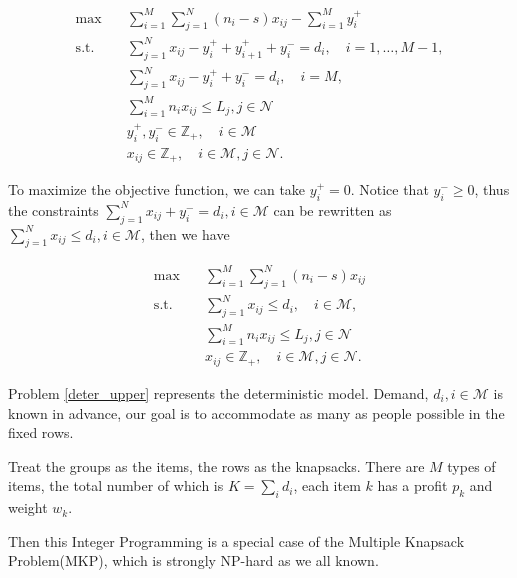 \begin{equation}\label{one_form}
  \begin{aligned}
  \max \quad & \sum_{i=1}^{M}  \sum_{j= 1}^{N} (n_i-s) x_{ij} - \sum_{i=1}^{M} y_{i}^{+}  \\
  \text {s.t.} \quad & \sum_{j= 1}^{N} x_{ij} - y_{i}^{+}+ y_{i+1}^{+} + y_{i}^{-} = d_{i}, \quad i = 1, \ldots, M-1, \\
  & \sum_{j= 1}^{N} x_{ij} -y_{i}^{+} + y_{i}^{-} = d_{i}, \quad i = M, \\
  & \sum_{i=1}^{M} n_{i} x_{ij} \leq L_j, j \in \mathcal{N}\\
  & y_{i}^{+}, y_{i}^{-} \in \mathbb{Z}_{+}, \quad i \in \mathcal{M} \\
  & x_{ij} \in \mathbb{Z}_{+}, \quad i \in \mathcal{M}, j \in \mathcal{N}.
  \end{aligned}
\end{equation}

To maximize the objective function, we can take $y_i^{+} = 0$. Notice that $y_{i}^{-} \geq 0$, thus the constraints $\sum_{j= 1}^{N} x_{ij} + y_{i}^{-} = d_{i}, i \in \mathcal{M}$ can be rewritten as $\sum_{j= 1}^{N} x_{ij} \leq d_{i}, i \in \mathcal{M}$, then we have

\begin{equation}\label{deter_upper}
  \begin{aligned}
  \max \quad & \sum_{i=1}^{M}  \sum_{j= 1}^{N} (n_i- s) x_{ij} \\
  \text {s.t.} \quad & \sum_{j= 1}^{N} x_{ij} \leq d_{i}, \quad i \in \mathcal{M}, \\
  & \sum_{i=1}^{M} n_{i} x_{ij} \leq L_j, j \in \mathcal{N} \\
  & x_{ij} \in \mathbb{Z}_{+}, \quad i \in \mathcal{M}, j \in \mathcal{N}.
  \end{aligned}
\end{equation}

Problem \eqref{deter_upper} represents the deterministic model. Demand, $d_i, i \in \mathcal{M}$ is known in advance, our goal is to accommodate as many as people possible in the fixed rows.

Treat the groups as the items, the rows as the knapsacks. There are $M$ types of items, the total number of which is $K = \sum_{i} d_i$, each item $k$ has a profit $p_k$ and weight $w_k$. 

Then this Integer Programming is a special case of the Multiple Knapsack Problem(MKP), which is strongly NP-hard as we all known.

